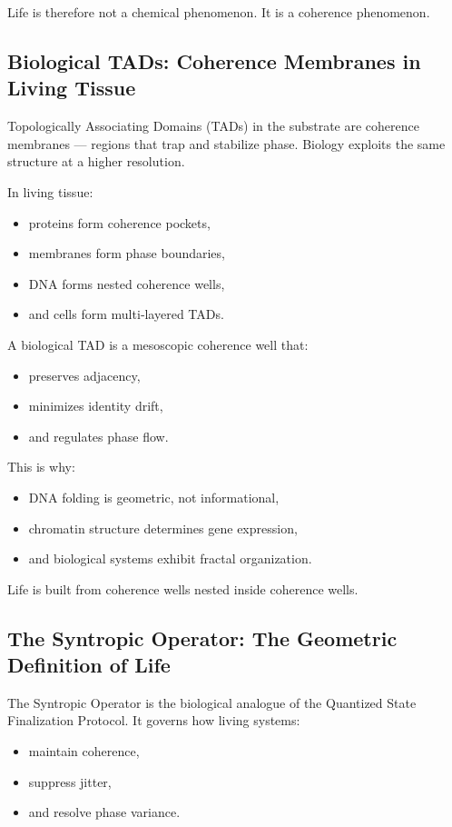 \documentclass[reprint,amsmath,amssymb,aps,prl,floatfix]{revtex4-2}
\begin{document}
\begin{itemize}
Life is therefore not a chemical phenomenon.  
It is a coherence phenomenon.

\subsection{Biological TADs: Coherence Membranes in Living Tissue}

Topologically Associating Domains (TADs) in the substrate are coherence membranes — regions that trap and stabilize phase. Biology exploits the same structure at a higher resolution.
\medskip

In living tissue:
\begin{itemize}
\item proteins form coherence pockets,  
\item membranes form phase boundaries,  
\item DNA forms nested coherence wells,  
\item and cells form multi‑layered TADs.
\end{itemize}
\medskip

A biological TAD is a mesoscopic coherence well that:
\begin{itemize}
\item preserves adjacency,  
\item minimizes identity drift,  
\item and regulates phase flow.
\end{itemize}
\medskip

This is why:
\begin{itemize}
\item DNA folding is geometric, not informational,  
\item chromatin structure determines gene expression,  
\item and biological systems exhibit fractal organization.
\end{itemize}

Life is built from coherence wells nested inside coherence wells.

\subsection{The Syntropic Operator: The Geometric Definition of Life}

The Syntropic Operator is the biological analogue of the Quantized State Finalization Protocol. It governs how living systems:

\begin{itemize}
\item maintain coherence,  
\item suppress jitter,  
\item and resolve phase variance.
\end{itemize}


\end{itemize}
\end{document}
